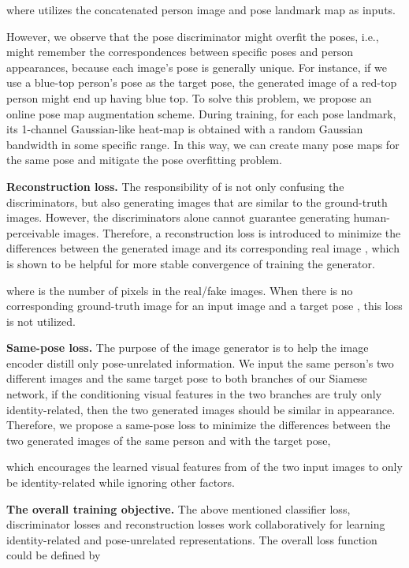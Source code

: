 \documentclass{article}
\begin{document}
where  utilizes the concatenated person image and pose landmark map as inputs. 

However, we observe that the pose discriminator  might overfit the poses, i.e.,  might remember the correspondences between specific poses and person appearances, because each image's pose is generally unique. For instance, if we use a blue-top person's pose as the target pose, the generated image of a red-top person might end up having blue top. To solve this problem, we propose an online pose map augmentation scheme. During training, for each pose landmark, its 1-channel Gaussian-like heat-map is obtained with a random Gaussian bandwidth in some specific range. In this way, we can create many pose maps for the same pose and mitigate the pose overfitting problem.

\textbf{Reconstruction loss.} The responsibility of  is not only confusing the discriminators, but also generating images that are similar to the ground-truth images. However, the discriminators alone cannot guarantee generating human-perceivable images. Therefore, a reconstruction loss is introduced to minimize the  differences between the generated image  and its corresponding real image , which is shown to be helpful for more stable convergence of training the generator.

where  is the number of pixels in the real/fake images.
When there is no corresponding ground-truth image  for an input image  and a target pose , this loss is not utilized.

\textbf{Same-pose loss.} The purpose of the image generator  is to help the image encoder distill only pose-unrelated information. We input the same person's two different images and the same target pose to both branches of our Siamese network, if the conditioning visual features in the two branches are truly only identity-related, then the two generated images should be similar in appearance. Therefore, we propose a same-pose loss to minimize the differences between the two generated images of the same person and with the target pose,

which encourages the learned visual features from  of the two input images to only be identity-related while ignoring other factors.


\textbf{The overall training objective.} The above mentioned classifier loss, discriminator losses and reconstruction losses work collaboratively for learning identity-related and pose-unrelated representations. The overall loss function could be defined by
\end{document}
